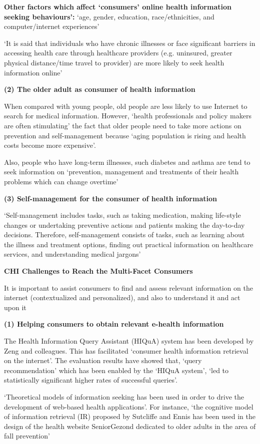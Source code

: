 \documentclass[]{article}
\begin{document}
\textbf{Other factors which affect ‘consumers’ online health information seeking behaviours’:} ‘age, gender, education, race/ethnicities, and computer/internet experiences’

‘It is said that individuals who have chronic illnesses or face significant barriers in accessing health care through healthcare providers (e.g. uninsured, greater physical distance/time travel to provider) are more likely to seek health information online’

\textbf{(2)	The older adult as consumer of health information}

When compared with young people, old people are less likely to use Internet to search for medical information. However, ‘health professionals and policy makers are often stimulating’ the fact that older people need to take more actions on prevention and self-management because ‘aging population is rising and health costs become more expensive’. 

Also, people who have long-term illnesses, such diabetes and asthma are tend to seek information on ‘prevention, management and treatments of their health problems which can change overtime’

\textbf{(3)	Self-management for the consumer of health information}

‘Self-management includes tasks, such as taking medication, making life-style changes or undertaking preventive actions and patients making the day-to-day decisions. Therefore, self-management consists of tasks, such as learning about the illness and treatment options, finding out practical information on healthcare services, and understanding medical jargons’

\textbf{CHI Challenges to Reach the Multi-Facet Consumers}

It is important to assist consumers to find and assess relevant information on the internet (contextualized and personalized), and also to understand it and act upon it

\textbf{(1)	Helping consumers to obtain relevant e-health information}

The Health Information Query Assistant (HIQuA) system has been developed by Zeng and colleagues. This has facilitated ‘consumer health information retrieval on the internet’. The evaluation results have showed that, ‘query recommendation’ which has been enabled by the ‘HIQuA system’, ‘led to statistically significant higher rates of successful queries’. 

‘Theoretical models of information seeking has been used in order to drive the development of web-based health applications’. For instance, ‘the cognitive model of information retrieval (IR) proposed by Sutcliffe and Ennis has been used in the design of the health website SeniorGezond dedicated to older adults in the area of fall prevention’ 
\end{document}
